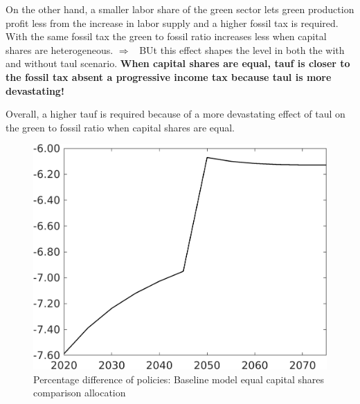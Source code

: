 \documentclass[12pt]{article}
\newcommand{\ar}{$\Rightarrow$ \ }
\begin{document}
On the other hand, a smaller labor share of the green sector lets green production profit less from the increase in labor supply and a higher fossil tax is required. With the same fossil tax the green to fossil ratio increases less when capital shares are heterogeneous. \ar BUt this effect shapes the level in both the with and without taul scenario.\textbf{  
When capital shares are equal, tauf is closer to the fossil tax absent a progressive income tax because taul is more devastating!}

Overall, a higher tauf is required because of a more devastating effect of taul on the green to fossil ratio when capital shares are equal. 
\begin{figure}[h!!]
	\centering
	\caption{Percentage difference of policies: Baseline model equal capital shares comparison allocation}\label{fig:Pertauf_nsk0_xgr0_equal}
	\begin{minipage}[]{0.32\textwidth}
		\includegraphics[width=1\textwidth]{../../codding_model/own_basedOnFried/optimalPol_010922_revision/figures/all_13Sept22/CompTaufPER_bytaul_Equlab_Reg0_tauf_spillover0_nsk0_xgr0_knspil0_sep0_LFlimit1_emsbase0_countec0_GovRev0_etaa0.79_lgd0.png}
	\end{minipage}		
	\begin{minipage}[]{0.32\textwidth}

\end{minipage}
\end{figure}
\end{document}
